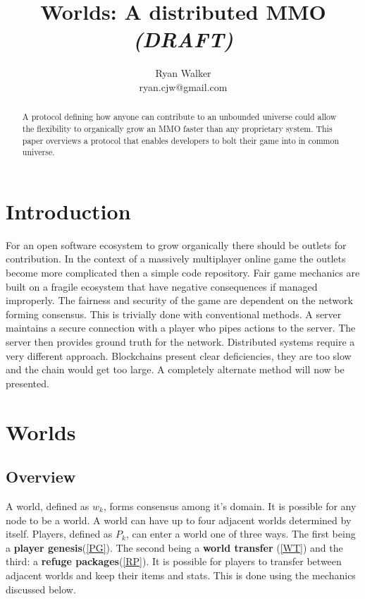 \documentclass[runningheads,a4paper]{llncs}
\begin{document}
\def \SystemName {Worlds} %

\mainmatter  %

\title{\SystemName: A distributed MMO \textit{(DRAFT)}}

\author{Ryan Walker\\
				ryan.cjw@gmail.com}

\institute{} %

\maketitle

\begin{abstract}
A protocol defining how anyone can contribute to an unbounded universe could allow the flexibility to organically grow an MMO faster than any proprietary system. This paper overviews a protocol that enables developers to bolt their game into in common universe. 
\end{abstract}

\section{Introduction}
For an open software ecosystem to grow organically there should be outlets for contribution. In the context of a massively multiplayer online game the outlets become more complicated then a simple code repository. Fair game mechanics are built on a fragile ecosystem that have negative consequences if managed improperly. The fairness and security of the game are dependent on the network forming consensus. This is trivially done with conventional methods. A server maintains a secure connection with a player who pipes actions to the server. The server then provides ground truth for the network. Distributed systems require a very different approach. Blockchains present clear deficiencies, they are too slow and the chain would get too large. A completely alternate method will now be presented.

\section{Worlds}
\subsection{Overview}
A world, defined as $w_k$, forms consensus among it's domain. It is possible for any node to be a world. A world can have up to four adjacent worlds determined by itself. Players, defined as $P_k$, can enter a world one of three ways. The first being a \textbf{player genesis}(\ref{PG}). The second being a \textbf{world transfer} (\ref{WT}) and the third: a \textbf{refuge packages}(\ref{RP}). It is possible for players to transfer between adjacent worlds and keep their items and stats. This is done using the mechanics discussed below.
\end{document}
